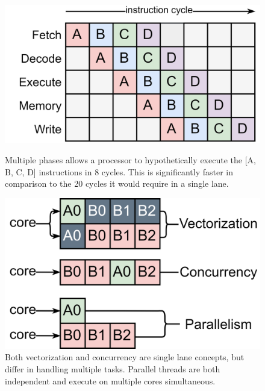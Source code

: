 \documentclass{article}
\begin{document}
\begin{figure}[ht]
    \centering
    \begin{minipage}{.5\textwidth}
        \centering
        \includegraphics[scale=0.09]{Performance4.png}
        \captionsetup{margin=0.2cm}
        \caption
        { 
            Multiple phases allows a processor to hypothetically execute the [A, B, C, D] instructions in 8 cycles.
            This is significantly faster in comparison to the 20 cycles it would require in a single lane.
        }
    \end{minipage}%
    \begin{minipage}{.5\textwidth}
        \centering
        \includegraphics[scale=0.09]{Performance5.png}
        \captionsetup{margin=0.2cm}
        \caption
        { 
            Both vectorization and concurrency are single lane concepts, but differ in handling multiple tasks.
            Parallel threads are both independent and execute on multiple cores simultaneous.      
        }
    \end{minipage}
\end{figure}
\end{document}

